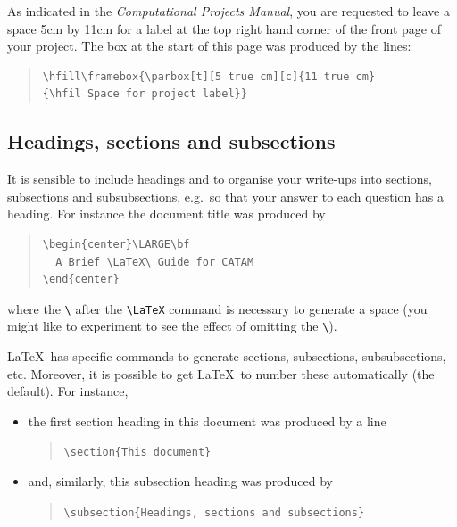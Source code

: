 
As indicated in the \textsl{Computational Projects Manual}, you are
requested to leave a space 5cm by 11cm for a label at the top right
hand corner of the front page of your project. The box at the start of
this page was produced by the lines:
\begin{quote}
\begin{verbatim}
\hfill\framebox{\parbox[t][5 true cm][c]{11 true cm}
{\hfil Space for project label}}
\end{verbatim}
\end{quote}

\subsection{Headings, sections and subsections}

It is sensible to include headings and to organise your write-ups into
sections, subsections and subsubsections, e.g.\ so that your answer to
each question has a heading. For instance the document title was
produced by
\begin{quote}
\begin{verbatim}
\begin{center}\LARGE\bf
  A Brief \LaTeX\ Guide for CATAM
\end{center}
\end{verbatim}
\end{quote}
where the \verb!\! after the \verb!\LaTeX! command is necessary to
generate a space (you might like to experiment to see the effect of
omitting the \verb!\!).

\LaTeX\ has specific commands to generate sections, subsections,
subsubsections, etc. Moreover, it is possible to get \LaTeX\ to
number these automatically (the default). For instance,
\begin{itemize}

\item the first section heading in this document was produced by a
  line
\begin{quote}
\verb|\section{This document}|
\end{quote}

\item and, similarly, this subsection heading was produced by
\begin{quote}
\verb$\subsection{Headings, sections and subsections}$
\end{quote}
\end{itemize}

